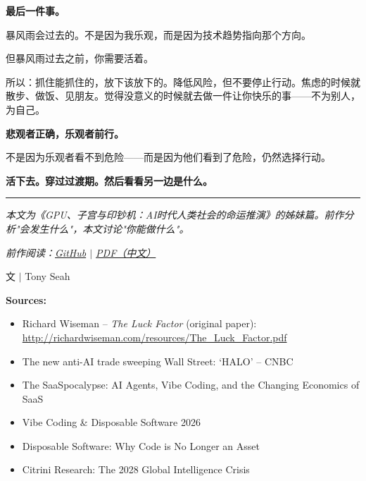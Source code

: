 \documentclass[a4paper,12pt,UTF8]{ctexart}
\begin{document}
\textbf{最后一件事。}

暴风雨会过去的。不是因为我乐观，而是因为技术趋势指向那个方向。

但暴风雨过去之前，你需要活着。

所以：抓住能抓住的，放下该放下的。降低风险，但不要停止行动。焦虑的时候就散步、做饭、见朋友。觉得没意义的时候就去做一件让你快乐的事——不为别人，为自己。

\textbf{悲观者正确，乐观者前行。}

不是因为乐观者看不到危险——而是因为他们看到了危险，仍然选择行动。

\textbf{活下去。穿过过渡期。然后看看另一边是什么。}

\vspace{2em}
{\color{rulecolor}\rule{\textwidth}{1pt}}
\vspace{1em}

\noindent\textit{本文为《GPU、子宫与印钞机：AI时代人类社会的命运推演》的姊妹篇。前作分析"会发生什么"，本文讨论"你能做什么"。}

\noindent\textit{前作阅读：\href{https://github.com/pkusnail/GPUs-Wombs-and-Money-Printers}{GitHub} $|$ \href{https://github.com/pkusnail/GPUs-Wombs-and-Money-Printers/raw/main/GPU、子宫与印钞机-v1.0.3.pdf}{PDF（中文）}}

\vspace{2em}

\begin{flushright}
文 $|$ Tony Seah
\end{flushright}

\vspace{2em}

{\small\noindent\textbf{Sources:}
\begin{itemize}[leftmargin=1.5em, itemsep=0.1em]
\item Richard Wiseman -- \textit{The Luck Factor} (original paper): \url{http://richardwiseman.com/resources/The_Luck_Factor.pdf}
\item The new anti-AI trade sweeping Wall Street: `HALO' -- CNBC
\item The SaaSpocalypse: AI Agents, Vibe Coding, and the Changing Economics of SaaS
\item Vibe Coding \& Disposable Software 2026
\item Disposable Software: Why Code is No Longer an Asset
\item Citrini Research: The 2028 Global Intelligence Crisis
\end{itemize}
}
\end{document}
